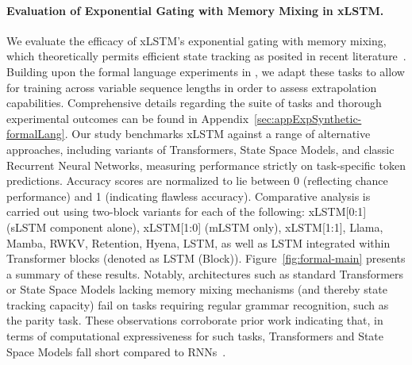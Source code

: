\paragraph{Evaluation of Exponential Gating with Memory Mixing in xLSTM.} We evaluate the efficacy of xLSTM’s exponential gating with memory mixing, which theoretically permits efficient state tracking as posited in recent literature~\citep{Merrill:24, Merrill:23}. Building upon the formal language experiments in \citet{Deletang:23}, we adapt these tasks to allow for training across variable sequence lengths in order to assess extrapolation capabilities. Comprehensive details regarding the suite of tasks and thorough experimental outcomes can be found in Appendix~\ref{sec:appExpSynthetic-formalLang}. Our study benchmarks xLSTM against a range of alternative approaches, including variants of Transformers, State Space Models, and classic Recurrent Neural Networks, measuring performance strictly on task-specific token predictions. Accuracy scores are normalized to lie between 0 (reflecting chance performance) and 1 (indicating flawless accuracy). Comparative analysis is carried out using two-block variants for each of the following: xLSTM[0:1] (sLSTM component alone), xLSTM[1:0] (mLSTM only), xLSTM[1:1], Llama, Mamba, RWKV, Retention, Hyena, LSTM, as well as LSTM integrated within Transformer blocks (denoted as LSTM (Block)). Figure~\ref{fig:formal-main} presents a summary of these results. Notably, architectures such as standard Transformers or State Space Models lacking memory mixing mechanisms (and thereby state tracking capacity) fail on tasks requiring regular grammar recognition, such as the parity task. These observations corroborate prior work indicating that, in terms of computational expressiveness for such tasks, Transformers and State Space Models fall short compared to RNNs~\citep{Merrill:24, Merrill:23, Deletang:23}.

